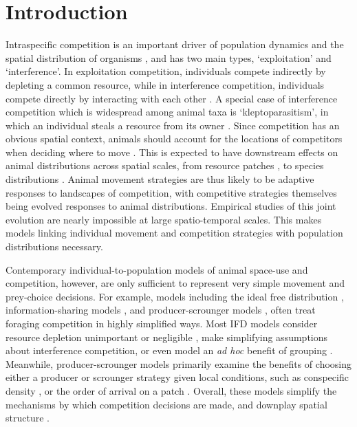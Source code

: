 
\section*{Introduction}
    Intraspecific competition is an important driver of population dynamics and the spatial distribution of organisms \citep{krebs1978}, and has two main types, `exploitation' and `interference'.
    In exploitation competition, individuals compete indirectly by depleting a common resource, while in interference competition, individuals compete directly by interacting with each other \citep{birch1957,case1974,keddy2001}.
    A special case of interference competition which is widespread among animal taxa is `kleptoparasitism', in which an individual steals a resource from its owner \citep{iyengar2008}.
    Since competition has an obvious spatial context, animals should account for the locations of competitors when deciding where to move \citep{nathan2008}.
    This is expected to have downstream effects on animal distributions across spatial scales, from resource patches \citep{fretwell1970}, to species distributions \citep{duckworth2007,schlagel2020}.
    Animal movement strategies are thus likely to be adaptive responses to landscapes of competition, with competitive strategies themselves being evolved responses to animal distributions.
    Empirical studies of this joint evolution are nearly impossible at large spatio-temporal scales.
    This makes models linking individual movement and competition strategies with population distributions necessary.

    Contemporary individual-to-population models of animal space-use \citep[reviewed in][]{deangelis2019} and competition, however, are only sufficient to represent very simple movement and prey-choice decisions.
    For example, models including the ideal free distribution \citep[IFD;][]{fretwell1970}, information-sharing models \citep[][]{giraldeau1999,folmer2012}, and producer-scrounger models \citep[][]{barnard1981,vickery1991,beauchamp2008}, often treat foraging competition in highly simplified ways.
    Most IFD models consider resource depletion unimportant or negligible \citep[continuous input models, see][]{tregenza1995, vandermeer1997}, make simplifying assumptions about interference competition, or even model an \textit{ad hoc} benefit of grouping \citep[e.g.][]{amano2006}.
    Meanwhile, producer-scrounger models primarily examine the benefits of choosing either a producer or scrounger strategy given local conditions, such as conspecific density \citep{vickery1991}, or the order of arrival on a patch \citep{beauchamp2008}.
    Overall, these models simplify the mechanisms by which competition decisions are made, and downplay spatial structure \citep[see also][]{holmgren1995, garay2020, spencer2018}.

